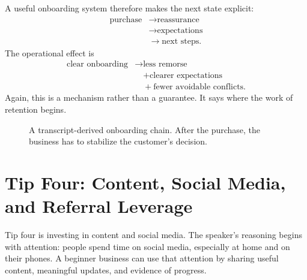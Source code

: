 A useful onboarding system therefore makes the next state explicit:
\[
\begin{aligned}
\text{purchase}
&\longrightarrow \text{reassurance} \\
&\longrightarrow \text{expectations} \\
&\longrightarrow \text{next steps}.
\end{aligned}
\]
The operational effect is
\[
\begin{aligned}
\text{clear onboarding}
&\longrightarrow \text{less remorse} \\
&\quad + \text{clearer expectations} \\
&\quad + \text{fewer avoidable conflicts}.
\end{aligned}
\]
Again, this is a mechanism rather than a guarantee. It says where the work of retention begins.

\begin{figure}
\centering
{}
\caption{A transcript-derived onboarding chain. After the purchase, the business has to stabilize the customer's decision.}
\end{figure}

\section{Tip Four: Content, Social Media, and Referral Leverage}

Tip four is investing in content and social media. The speaker's reasoning begins with attention: people spend time on social media, especially at home and on their phones. A beginner business can use that attention by sharing useful content, meaningful updates, and evidence of progress.

